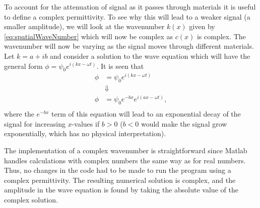 \documentclass[10pt,a4paper]{article}
\begin{document}
To account for the attenuation of signal as it passes through materials it is useful to define a complex permittivity. To see why this will lead to a weaker signal (a smaller amplitude), we will look at the wavenumber $k(x)$ given by \eqref{eq:spatialWaveNumber} which will now be complex as $c(x)$ is complex. The wavenumber will now be varying as the signal moves through different materials. Let $k = a + ib$ and consider a solution to the wave equation which will have the general form $\phi = \psi_0 e^{i(kx- \omega t)}$. It is seen that 
\begin{align*}
\phi &= \psi_0 e^{i(kx- \omega t)} \\
 &\Downarrow \\
 \phi &= \psi_0 e^{-bx} e^{i(ax- \omega t)}, \\
\end{align*}
where the $e^{-bx}$ term of this equation will lead to an exponential decay of the signal for increasing $x$-values if $b>0$ ($b<0$ would make the signal grow exponentially, which has no physical interpretation).

The implementation of a complex wavenumber is straightforward since Matlab handles calculations with complex numbers the same way as for real numbers. Thus, no changes in the code had to be made to run the program using a complex permittivity. The resulting numerical solution is complex, and the amplitude in the wave equation is found by taking the absolute value of the complex solution.
\end{document}
